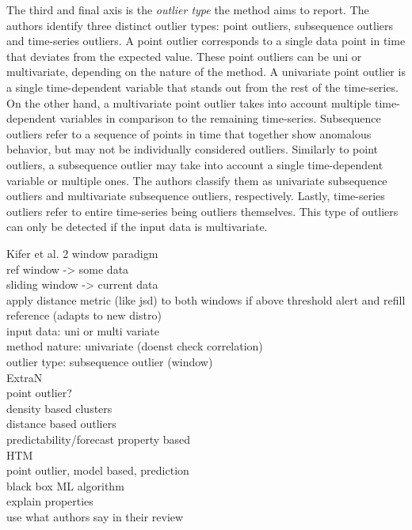 The third and final axis is the \textit{outlier type} the method aims to report. The authors identify three distinct outlier types: point outliers, subsequence outliers and time-series outliers. A point outlier corresponds to a single data point in time that deviates from the expected value. These point outliers can be uni or multivariate, depending on the nature of the method. A univariate point outlier is a single time-dependent variable that stands out from the rest of the time-series. On the other hand, a multivariate point outlier takes into account multiple time-dependent variables in comparison to the remaining time-series. Subsequence outliers refer to a sequence of points in time that together show anomalous behavior, but may not be individually considered outliers. Similarly to point outliers, a subsequence outlier may take into account a single time-dependent variable or multiple ones. The authors classify them as univariate subsequence outliers and multivariate subsequence outliers, respectively. Lastly, time-series outliers refer to entire time-series being outliers themselves. This type of outliers can only be detected if the input data is multivariate.


Kifer et al. 2 window paradigm \\
ref window -> some data\\
sliding window -> current data\\
apply distance metric (like jsd) to both windows if above threshold alert and refill reference (adapts to new distro)\\
input data: uni or multi variate\\
method nature: univariate (doenst check correlation)\\
outlier type: subsequence outlier (window)\\


ExtraN\\
point outlier?\\
density based clusters\\
distance based outliers\\
predictability/forecast property based\\

HTM\\
point outlier, model based, prediction\\
black box ML algorithm\\
explain properties\\
use what authors say in their review\\


